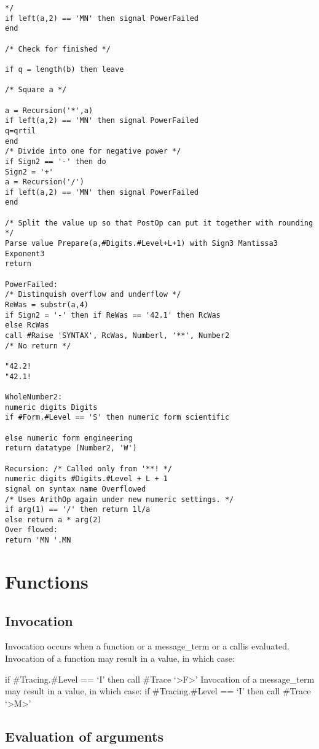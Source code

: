 \begin{verbatim}
*/
if left(a,2) == 'MN' then signal PowerFailed
end

/* Check for finished */

if q = length(b) then leave

/* Square a */

a = Recursion('*',a)
if left(a,2) == 'MN' then signal PowerFailed
q=qrtil
end
/* Divide into one for negative power */
if Sign2 == '-' then do
Sign2 = '+'
a = Recursion('/')
if left(a,2) == 'MN' then signal PowerFailed
end

/* Split the value up so that PostOp can put it together with rounding */
Parse value Prepare(a,#Digits.#Level+L+1) with Sign3 Mantissa3 Exponent3
return

PowerFailed:
/* Distinquish overflow and underflow */
ReWas = substr(a,4)
if Sign2 = '-' then if ReWas == '42.1' then RcWas
else RcWas
call #Raise 'SYNTAX', RcWas, Numberl, '**', Number2
/* No return */

"42.2!
"42.1!

WholeNumber2:
numeric digits Digits
if #Form.#Level == 'S' then numeric form scientific

else numeric form engineering
return datatype (Number2, 'W')

Recursion: /* Called only from '**! */
numeric digits #Digits.#Level + L + 1
signal on syntax name Overflowed
/* Uses ArithOp again under new numeric settings. */
if arg(1) == '/' then return 1l/a
else return a * arg(2)
Over flowed:
return 'MN '.MN
\end{verbatim}

\hypertarget{functions}{%
\section{Functions}\label{functions}}

\hypertarget{invocation}{%
\subsection{Invocation}\label{invocation}}

Invocation occurs when a function or a message\_term or a callis
evaluated. Invocation of a function may result in a value, in which
case:

if \#Tracing.\#Level == `I' then call \#Trace
`\textgreater F\textgreater{}' Invocation of a message\_term may result
in a value, in which case: if \#Tracing.\#Level == `I' then call \#Trace
`\textgreater M\textgreater{}'

\hypertarget{evaluation-of-arguments}{%
\subsection{Evaluation of arguments}\label{evaluation-of-arguments}}

